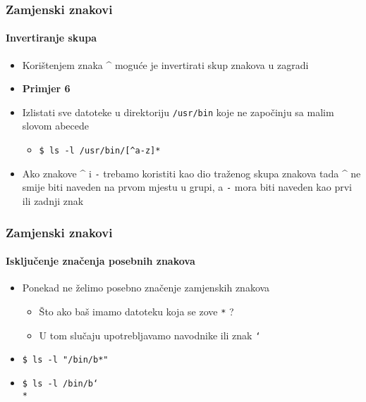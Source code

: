 \documentclass{beamer}
\newcommand{\shell}[1]{\texttt{#1}}
\begin{document}
\begin{frame}[t]
\frametitle{Zamjenski znakovi}
\framesubtitle{Invertiranje skupa}
\begin{itemize}
  \item Korištenjem znaka \textasciicircum{} moguće je invertirati skup 
        znakova u zagradi 
\end{itemize}
\vfill
\begin{itemize}
\item \textbf{Primjer 6}
  \item[] Izlistati sve datoteke u direktoriju \shell{/usr/bin} koje ne 
        započinju sa malim slovom abecede
  \begin{itemize}
    \item[] \shell{\$ ls -l /usr/bin/[\textasciicircum{}a-z]*}
  \end{itemize}
\end{itemize}
\vfill
\begin{itemize}
  \item Ako znakove \textasciicircum{} i \shell{-} trebamo koristiti kao dio traženog skupa znakova tada \textasciicircum{} ne smije biti naveden na prvom mjestu u grupi, a \shell{-} mora biti naveden kao prvi ili zadnji znak
\end{itemize}
\end{frame}

\begin{frame}[t]
\frametitle{Zamjenski znakovi}
\framesubtitle{Isključenje značenja posebnih znakova}
\begin{itemize}
  \item Ponekad ne želimo posebno značenje zamjenskih znakova
  \begin{itemize}
    \item Što ako baš imamo datoteku koja se zove \shell{*} ?
    \item U tom slučaju upotrebljavamo navodnike ili znak 
          \shell{\char`\\}
  \end{itemize}
\end{itemize}
\small
  \begin{itemize}
    \item[] \shell{\$ ls -l "/bin/b*"}
    \item[] \shell{\$ ls -l /bin/b\char`\\{}*}
  \end{itemize}
\end{frame}
\end{document}
